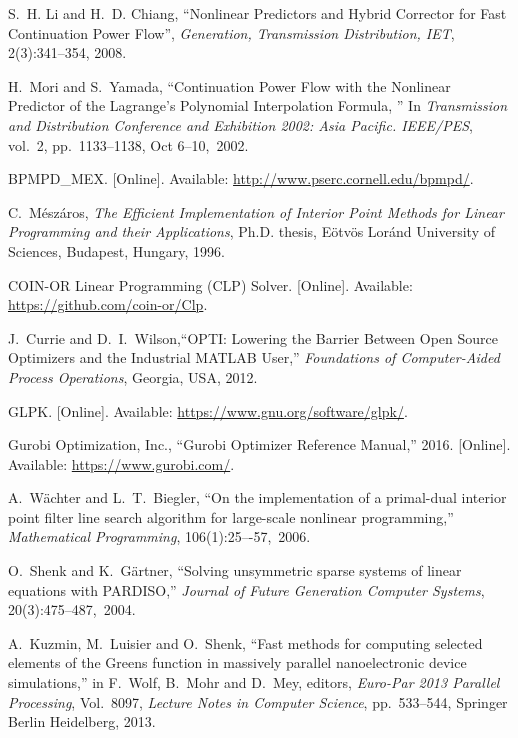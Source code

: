 \documentclass[12pt]{article}
\numberwithin{equation}{section}
\numberwithin{table}{section}
\numberwithin{figure}{section}
\begin{document}
\begin{thebibliography}{99}
S.~H. Li and H.~D. Chiang, ``Nonlinear Predictors and Hybrid Corrector for Fast Continuation Power Flow'', {\em Generation, Transmission Distribution, IET}, 2(3):341--354, 2008.

H.~Mori and S.~Yamada, ``Continuation Power Flow with the Nonlinear Predictor of the Lagrange's Polynomial Interpolation Formula, '' In {\em Transmission and Distribution Conference and Exhibition 2002:
  Asia Pacific. IEEE/PES}, vol.~2, pp.~1133--1138, Oct 6--10,~2002.

BPMPD\_MEX. [Online]. Available:
  \url{http://www.pserc.cornell.edu/bpmpd/}.

C.~M{\'e}sz{\'a}ros, \emph{The Efficient Implementation of Interior Point Methods for Linear Programming and their Applications}, Ph.D. thesis,
  E{\"o}tv{\"o}s Lor{\'a}nd University of Sciences, Budapest, Hungary, 1996.

COIN-OR Linear Programming (CLP) Solver. [Online]. Available:
  \url{https://github.com/coin-or/Clp}.

J.~Currie and D.~I.~Wilson,``OPTI: Lowering the Barrier Between Open Source Optimizers and the Industrial MATLAB User,'' \emph{Foundations of Computer-Aided Process Operations}, Georgia, USA, 2012.

GLPK. [Online]. Available:
  \url{https://www.gnu.org/software/glpk/}.

Gurobi Optimization, Inc., ``Gurobi Optimizer Reference Manual,'' 2016. [Online]. Available:
  \url{https://www.gurobi.com/}.

A.~W\"achter and L.~T.~Biegler, ``On the implementation of a primal-dual interior point filter line search algorithm for large-scale nonlinear programming,'' \emph{Mathematical Programming}, 106(1):25–-57,~2006.

O.~Shenk and K.~G\"artner, ``Solving unsymmetric sparse systems of linear equations with PARDISO,'' \emph{Journal of Future Generation Computer Systems}, 20(3):475--487,~2004.

A.~Kuzmin, M.~Luisier and O.~Shenk, ``Fast methods for computing selected elements of the Greens function in massively parallel nanoelectronic device simulations,'' in F.~Wolf, B.~Mohr and D.~Mey, editors, \emph{Euro-Par 2013 Parallel Processing}, Vol.~8097, \emph{Lecture Notes in Computer Science}, pp.~533--544, Springer Berlin Heidelberg, 2013.


\end{thebibliography}
\end{document}
